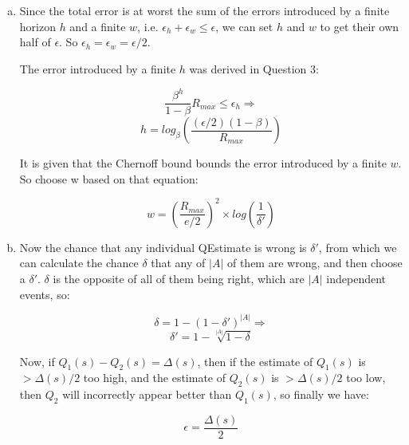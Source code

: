 \documentclass{article}
\begin{document}
\section{}
\begin{enumerate}[(a)]
\item
Since the total error is at worst the sum of the errors introduced by a finite
horizon $h$ and a finite $w$, i.e. $\epsilon_h + \epsilon_w \le \epsilon$, we
can set $h$ and $w$ to get their own half of $\epsilon$. So
$\epsilon_h=\epsilon_w = \epsilon/2$.

\vspace{1em}

The error introduced by a finite $h$ was derived in Question 3:

\[
\frac{\beta^h}{1-\beta}R_{max} \le \epsilon_h \Longrightarrow
\]
\[
h = log_{\beta}(\frac{(\epsilon /2)(1-\beta)}{R_{max}})
\]

It is given that the Chernoff bound bounds the error introduced by a finite $w$.
So choose w based on that equation:

\[
w = (\frac{R_{max}}{e/2})^2 \times log(\frac{1}{\delta'})
\]

\item
Now the chance that any individual QEstimate is wrong is $\delta '$, from which
we can calculate the chance $\delta$ that any of $|A|$ of them are wrong, and
then choose a $\delta '$. $\delta$ is the opposite of all of them being right,
which are $|A|$ independent events, so:

\[
\delta = 1-(1-\delta')^{|A|} \Longrightarrow
\]
\[
\delta' = 1 - \sqrt[|A|]{1-\delta}
\]

Now, if $Q_1(s) - Q_2(s) = \Delta(s)$, then if the estimate of $Q_1(s)$ is
$>\Delta(s)/2$ too high, and the estimate of $Q_2(s)$ is $>\Delta(s)/2$
too low, then $Q_2$ will incorrectly appear better than $Q_1(s)$, so finally
we have:

\[
\epsilon = \frac{\Delta(s)}{2}
\]

\end{enumerate}
\end{document}
